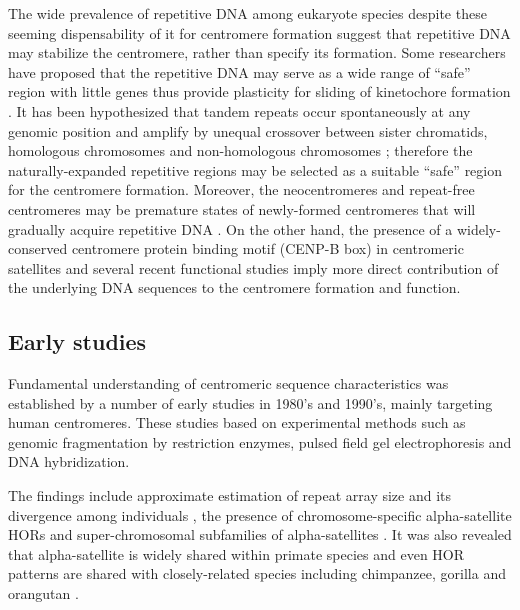   The wide prevalence of repetitive DNA among eukaryote species despite these seeming dispensability of it for centromere formation suggest that repetitive DNA may stabilize the centromere, rather than specify its formation. Some researchers have proposed that the repetitive DNA may serve as a wide range of ``safe'' region with little genes thus provide plasticity for sliding of kinetochore formation \cite{Plohl2014, Fukagawa2014}. It has been hypothesized that tandem repeats occur spontaneously at any genomic position and amplify by unequal crossover between sister chromatids, homologous chromosomes and non-homologous chromosomes \cite{Smith1976, Willard1991, Charlesworth1994}; therefore the naturally-expanded repetitive regions may be selected as a suitable ``safe'' region for the centromere formation. Moreover, the neocentromeres and repeat-free centromeres may be premature states of newly-formed centromeres that will gradually acquire repetitive DNA \cite{Fukagawa2014}. On the other hand, the presence of a widely-conserved centromere protein binding motif (CENP-B box) in centromeric satellites \cite{Henikoff2001} and several recent functional studies \cite{Henikoff2015, Aldrup-MacDonald2016} imply more direct contribution of the underlying DNA sequences to the centromere formation and function.


\subsection*{Early studies}
  Fundamental understanding of centromeric sequence characteristics was established by a number of early studies in 1980's and 1990's, mainly targeting human centromeres. These studies based on experimental methods such as genomic fragmentation by restriction enzymes, pulsed field gel electrophoresis and DNA hybridization.

  The findings include approximate estimation of repeat array size and its divergence among individuals \cite{Oakey1990, Mahtani1990, Greig1991}, the presence of chromosome-specific alpha-satellite HORs \cite{Willard1987} and super-chromosomal subfamilies of alpha-satellites \cite{Alexandrov1988, Alexandrov2001}. It was also revealed that alpha-satellite is widely shared within primate species and even HOR patterns are shared with closely-related species including chimpanzee, gorilla and orangutan \cite{Willard1991}.


